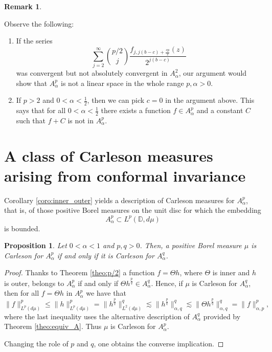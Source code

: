 \documentclass[12pt]{amsart}
\newtheorem{proposition}[theorem]{Proposition}
\theoremstyle{definition}
\newtheorem{remark}[theorem]{Remark}
\newcommand{\D}{\mathbb{{D}}}
\numberwithin{equation}{section}
\begin{document}
        \begin{remark} \label{rem:RemaingCases}
    
            Observe the following:
            \begin{enumerate}
                
                \item If the series
                    \[
                        \sum_{j = 2}^\infty \binom{p/2}{j} \dfrac{f_{j,j(b-c)+\frac{cp}{2}} (z)}{2^{j(b-c)}}
                    \]
                    was convergent but not absolutely convergent in $A^2_\alpha$, our argument would show that $A^p_\alpha$ is not a linear space in the whole range $p, \alpha > 0$.
        
                \item If $p > 2$ and $0< \alpha < \frac{1}{2}$, then we can pick $c = 0$ in the argument above. This says that for all $0<\alpha<\tfrac{1}{2}$ there exists a function $f\in A^p_\alpha$ and a constant $C$ such that $f+C$ is not in $A^p_\alpha$.
            \end{enumerate}
        	
        \end{remark}

    \section{A class of Carleson measures arising from conformal invariance}
    \label{sec:cm}

        Corollary \ref{coro:inner_outer} yields a description of Carleson measures for $A^p_\alpha$, that is, of those positive Borel measures on the unit disc for which the embedding
            \[
                A^p_\alpha\subset L^p(\D, d\mu)
            \]
            is bounded. 

        \begin{proposition}
        \label{prop:CM_same}
            Let $0<\alpha<1$ and $p, q>0$. Then, a positive Borel measure $\mu$ is Carleson for $A^p_\alpha$ if and only if it is Carleson for $A^q_\alpha$. 
        \end{proposition}
    
        \begin{proof}
            Thanks to Theorem \ref{theo:p/2} a function $f = \Theta h$, where $\Theta$ is inner and $h$ is outer, belongs to $A^p_\alpha$ if and only if $\Theta h^\frac{p}{q}\in A^q_\alpha$. Hence, if $\mu$ is Carleson for $A^q_\alpha$, then for all $f=\Theta h$ in $A^p_\alpha$ we have that
                \[
                    \|f\|_{L^p(d\mu)}^p \le \|h\|_{L^p(d\mu)}^p = \|h^\frac{p}{q}\|_{L^2(d\mu)}^q\lesssim\|h^\frac{p}{q}\|_{\alpha, q}^q\lesssim\|\Theta h^\frac{p}{q}\|_{\alpha, q}^q=\|f\|^p_{\alpha, p},
                \]
                where the last inequality uses the alternative description of $A^q_\alpha$ provided by Theorem \ref{theo:equiv_A}. Thus $\mu$ is Carleson for $A^p_\alpha$.
                
            Changing the role of $p$ and $q$, one obtains the converse implication.
        \end{proof}
\end{document}
